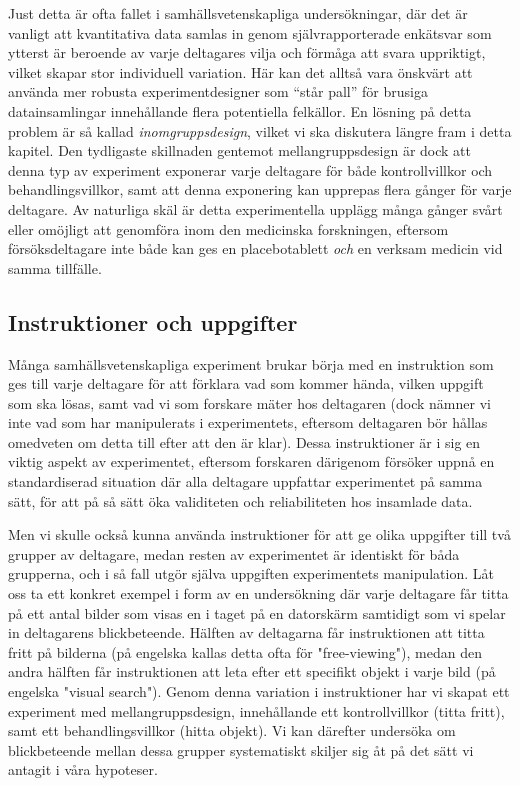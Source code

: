 \documentclass[
]{book}
\begin{document}
Just detta är ofta fallet i samhällsvetenskapliga undersökningar, där det är vanligt att kvantitativa data samlas in genom självrapporterade enkätsvar som ytterst är beroende av varje deltagares vilja och förmåga att svara uppriktigt, vilket skapar stor individuell variation. Här kan det alltså vara önskvärt att använda mer robusta experimentdesigner som ``står pall'' för brusiga datainsamlingar innehållande flera potentiella felkällor. En lösning på detta problem är så kallad \emph{inomgruppsdesign}, vilket vi ska diskutera längre fram i detta kapitel. Den tydligaste skillnaden gentemot mellangruppsdesign är dock att denna typ av experiment exponerar varje deltagare för både kontrollvillkor och behandlingsvillkor, samt att denna exponering kan upprepas flera gånger för varje deltagare. Av naturliga skäl är detta experimentella upplägg många gånger svårt eller omöjligt att genomföra inom den medicinska forskningen, eftersom försöksdeltagare inte både kan ges en placebotablett \emph{och} en verksam medicin vid samma tillfälle.

\hypertarget{sub07.5.1}{%
\subsection{Instruktioner och uppgifter}\label{sub07.5.1}}

Många samhällsvetenskapliga experiment brukar börja med en instruktion som ges till varje deltagare för att förklara vad som kommer hända, vilken uppgift som ska lösas, samt vad vi som forskare mäter hos deltagaren (dock nämner vi inte vad som har manipulerats i experimentets, eftersom deltagaren bör hållas omedveten om detta till efter att den är klar). Dessa instruktioner är i sig en viktig aspekt av experimentet, eftersom forskaren därigenom försöker uppnå en standardiserad situation där alla deltagare uppfattar experimentet på samma sätt, för att på så sätt öka validiteten och reliabiliteten hos insamlade data.

Men vi skulle också kunna använda instruktioner för att ge olika uppgifter till två grupper av deltagare, medan resten av experimentet är identiskt för båda grupperna, och i så fall utgör själva uppgiften experimentets manipulation. Låt oss ta ett konkret exempel i form av en undersökning där varje deltagare får titta på ett antal bilder som visas en i taget på en datorskärm samtidigt som vi spelar in deltagarens blickbeteende. Hälften av deltagarna får instruktionen att titta fritt på bilderna (på engelska kallas detta ofta för "free-viewing"), medan den andra hälften får instruktionen att leta efter ett specifikt objekt i varje bild (på engelska "visual search"). Genom denna variation i instruktioner har vi skapat ett experiment med mellangruppsdesign, innehållande ett kontrollvillkor (titta fritt), samt ett behandlingsvillkor (hitta objekt). Vi kan därefter undersöka om blickbeteende mellan dessa grupper systematiskt skiljer sig åt på det sätt vi antagit i våra hypoteser.
\end{document}
